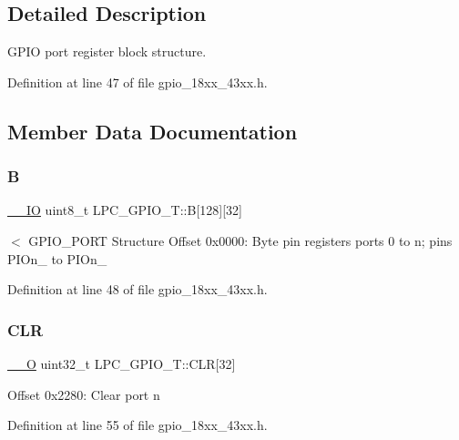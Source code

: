 \subsection{Detailed Description}
G\+P\+IO port register block structure. 

Definition at line 47 of file gpio\+\_\+18xx\+\_\+43xx.\+h.



\subsection{Member Data Documentation}
\mbox{\label{struct_l_p_c___g_p_i_o___t_afab9d12b9b8bf02d2c9cfa4893244c7f}} 
\subsubsection{\texorpdfstring{B}{B}}
{\footnotesize\ttfamily \hyperlink{core__sc300_8h_aec43007d9998a0a0e01faede4133d6be}{\+\_\+\+\_\+\+IO} uint8\+\_\+t L\+P\+C\+\_\+\+G\+P\+I\+O\+\_\+\+T\+::B\mbox{[}128\mbox{]}\mbox{[}32\mbox{]}}

$<$ G\+P\+I\+O\+\_\+\+P\+O\+RT Structure Offset 0x0000\+: Byte pin registers ports 0 to n; pins P\+I\+On\+\_ to P\+I\+On\+\_ 

Definition at line 48 of file gpio\+\_\+18xx\+\_\+43xx.\+h.

\mbox{\label{struct_l_p_c___g_p_i_o___t_a7f34f27b387316a478bac811800c07a2}} 
\subsubsection{\texorpdfstring{C\+LR}{CLR}}
{\footnotesize\ttfamily \hyperlink{core__sc300_8h_a7e25d9380f9ef903923964322e71f2f6}{\+\_\+\+\_\+O} uint32\+\_\+t L\+P\+C\+\_\+\+G\+P\+I\+O\+\_\+\+T\+::\+C\+LR\mbox{[}32\mbox{]}}

Offset 0x2280\+: Clear port n 

Definition at line 55 of file gpio\+\_\+18xx\+\_\+43xx.\+h.

\mbox{\label{struct_l_p_c___g_p_i_o___t_a3e0f544e9066a86ac598a9d7afa3713b}} 
